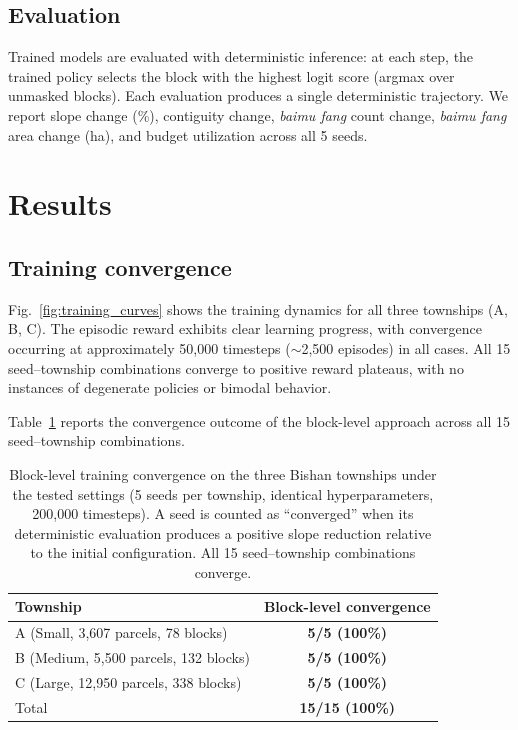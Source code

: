 \documentclass[preprint,12pt]{elsarticle}
\begin{document}
\subsection{Evaluation}

Trained models are evaluated with deterministic inference: at each step, the trained policy selects the block with the highest logit score (argmax over unmasked blocks). Each evaluation produces a single deterministic trajectory. We report slope change (\%), contiguity change, \textit{baimu fang} count change, \textit{baimu fang} area change (ha), and budget utilization across all 5 seeds.


\section{Results}
\label{sec:results}

\subsection{Training convergence}
\label{sec:convergence}

Fig.~\ref{fig:training_curves} shows the training dynamics for all three townships (A, B, C). The episodic reward exhibits clear learning progress, with convergence occurring at approximately 50{,}000 timesteps ($\sim$2{,}500 episodes) in all cases. All 15 seed--township combinations converge to positive reward plateaus, with no instances of degenerate policies or bimodal behavior.

Table~\ref{tab:convergence} reports the convergence outcome of the block-level approach across all 15 seed--township combinations.

\begin{table}[htbp]
\centering
\caption{Block-level training convergence on the three Bishan townships under the tested settings (5 seeds per township, identical hyperparameters, 200{,}000 timesteps). A seed is counted as ``converged'' when its deterministic evaluation produces a positive slope reduction relative to the initial configuration. All 15 seed--township combinations converge.}
\label{tab:convergence}
\begin{tabular}{lc}
\toprule
Township & Block-level convergence \\
\midrule
A (Small, 3{,}607 parcels, 78 blocks)   & \textbf{5/5 (100\%)} \\
B (Medium, 5{,}500 parcels, 132 blocks) & \textbf{5/5 (100\%)} \\
C (Large, 12{,}950 parcels, 338 blocks) & \textbf{5/5 (100\%)} \\
\midrule
Total                                    & \textbf{15/15 (100\%)} \\
\bottomrule
\end{tabular}
\end{table}
\end{document}
